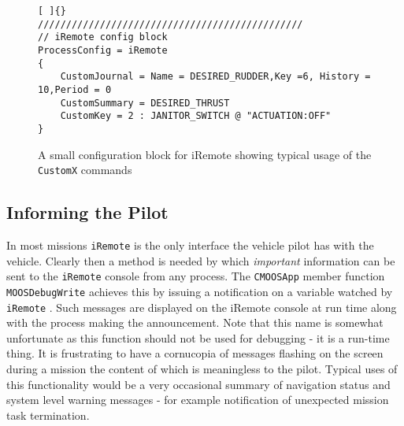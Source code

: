 \documentclass[a4paper,10pt]{article}
\newcommand{\Code}[1]{\texttt{#1} }
\newcommand{\code}[1]{\Code{#1} }
\begin{document}
\begin{figure}[ht]
\begin{lstlisting}[ ]{}
///////////////////////////////////////////////
// iRemote config block
ProcessConfig = iRemote
{
    CustomJournal = Name = DESIRED_RUDDER,Key =6, History = 10,Period = 0
    CustomSummary = DESIRED_THRUST
    CustomKey = 2 : JANITOR_SWITCH @ "ACTUATION:OFF"
}
\end{lstlisting}
\caption{A small configuration block for iRemote showing typical
usage of the \code{CustomX} commands}\label{fig:iRemoteBlock}
\end{figure}


\subsection{Informing the Pilot}
In most missions \code{iRemote} is the only interface the vehicle
pilot has with the vehicle. Clearly then a method is needed by
which {\em{important}} information can be sent to the
\code{iRemote} console from any process. The \code{CMOOSApp}
member function \code{MOOSDebugWrite} achieves this by issuing a
notification on a variable watched by \code{iRemote}. Such
messages are displayed on the iRemote console at run time along
with the process making the announcement. Note that this  name is
somewhat unfortunate as this function should not be used for
debugging - it is a run-time thing. It is frustrating to have a
cornucopia of messages flashing on the screen during a mission the
content of which is meaningless to the pilot. Typical uses of this
functionality would be a very occasional summary of navigation
status and system level warning messages - for example
notification of unexpected mission task  termination.
\end{document}
